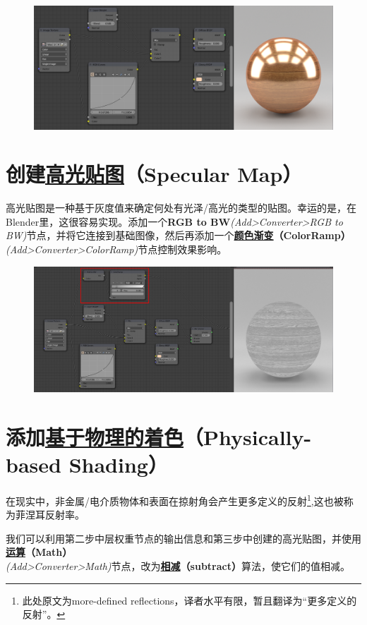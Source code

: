 \documentclass[11pt,a4paper,UTF8]{ctexart}
\begin{document}
\begin{figure}[hb]
    \centering
    \includegraphics[scale=0.41]{step2}
\end{figure}

\newpage
\section{创建\underline{高光贴图}（Specular Map）}
高光贴图是一种基于灰度值来确定何处有光泽/高光的类型的贴图。幸运的是，在Blender里，这很容易实现。添加一个\textbf{RGB to BW}\emph{(Add>Converter>RGB to BW)}节点，并将它连接到基础图像，然后再添加一个\textbf{\underline{颜色渐变}（ColorRamp）}\emph{(Add>Converter>ColorRamp)}节点控制效果影响。

\begin{figure}[hb]
    \centering
    \includegraphics[scale=0.41]{step3}
\end{figure}

\section{添加\underline{基于物理的着色}（Physically-based Shading）}
在现实中，非金属/电介质物体和表面在掠射角会产生更多定义的反射\footnote{此处原文为more-defined reflections，译者水平有限，暂且翻译为“更多定义的反射”。},这也被称为菲涅耳反射率。

我们可以利用第二步中层权重节点的输出信息和第三步中创建的高光贴图，并使用\textbf{\underline{运算}（Math）}\\\emph{(Add>Converter>Math)}节点，改为\textbf{\underline{相减}（subtract）}算法，使它们的值相减。
\end{document}
